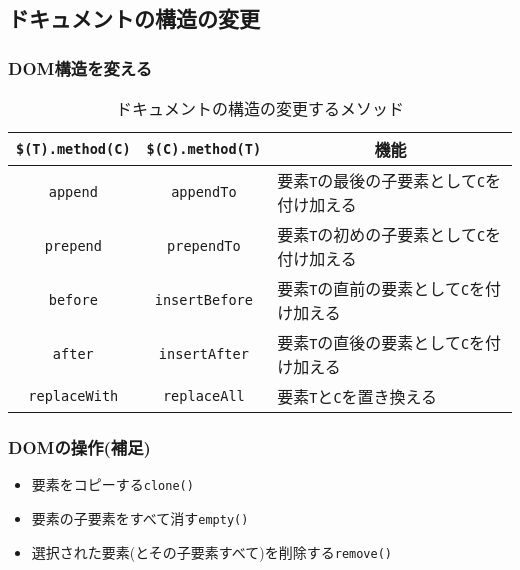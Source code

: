 \subsection{ドキュメントの構造の変更}
\begin{frame}[containsverbatim]
\frametitle{DOM構造を変える}
\begin{table}[ht]
 \caption{ドキュメントの構造の変更するメソッド}\label{Insertreplace}
\begin{tabular}{|c|c|m{}|}
 \hline
 \texttt{\$(T).method(C)}&\texttt{\$(C).method(T)}&
    \multicolumn{1}{c|}{機能}\\\hline
 \texttt{append}&\texttt{appendTo}&
	 要素\texttt{T}の最後の子要素として\texttt{C}を付け加える\\ \hline
 \texttt{prepend}&\texttt{prependTo}&
	 要素\texttt{T}の初めの子要素として\texttt{C}を付け加える\\ \hline
 \texttt{before}&\texttt{insertBefore}&
	 要素\texttt{T}の直前の要素として\texttt{C}を付け加える\\ \hline
 \texttt{after}&\texttt{insertAfter}&
	 要素\texttt{T}の直後の要素として\texttt{C}を付け加える\\ \hline
 \texttt{replaceWith}&\texttt{replaceAll}&
	 要素\texttt{T}と\texttt{C}を置き換える\\ \hline
\end{tabular}\end{table}
\end{frame}
\begin{frame}[containsverbatim]
\frametitle{DOMの操作(補足)}
\begin{itemize}
 \item 要素をコピーする\texttt{clone()}
 \item 要素の子要素をすべて消す\texttt{empty()}
 \item 選択された要素(とその子要素すべて)を削除する\texttt{remove()}
\end{itemize}
\end{frame}
